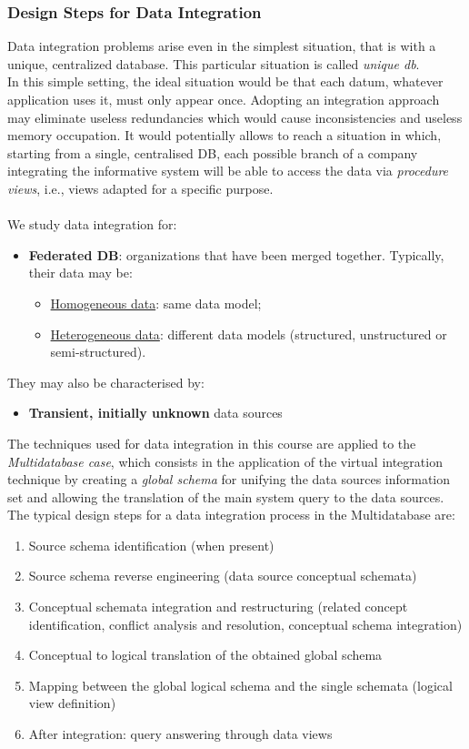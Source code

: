 \documentclass[10pt,a4paper]{article}
\newcommand{\nline}{\\~\\}
\begin{document}
\subsubsection{Design Steps for Data Integration}
\begin{justify}
Data integration problems arise even in the simplest situation, that is with a unique, centralized database. This particular situation is called \textit{unique db}.\\
In this simple setting, the ideal situation would be that each datum, whatever application uses it, must only appear once. Adopting an integration approach may eliminate useless redundancies which would cause inconsistencies and useless memory occupation. It would potentially allows to reach a situation in which, starting from a single, centralised DB, each possible branch of a company integrating the informative system will be able to access the data via \textit{procedure views}, i.e., views adapted for a specific purpose. \nline
We study data integration for:
\begin{itemize}
	\item \textbf{Federated DB}: organizations that have been merged together. Typically, their data may be:
	\begin{itemize}
		\item \uline{Homogeneous data}: same data model;
		\item \uline{Heterogeneous data}: different data models (structured, unstructured or semi-structured).
	\end{itemize}
\end{itemize}
They may also be characterised by:
\begin{itemize}
	\item \textbf{Transient, initially unknown} data sources
\end{itemize}
The techniques used for data integration in this course are applied to the \textit{Multidatabase case}, which consists in the application of the virtual integration technique by creating a \textit{global schema} for unifying the data sources information set and allowing the translation of the main system query to the data sources.
The typical design steps for a data integration process in the Multidatabase are:
\begin{enumerate}
	\item Source schema identification (when present)
	\item Source schema reverse engineering (data source conceptual schemata)
	\item Conceptual schemata integration and restructuring (related concept identification, conflict analysis and resolution, conceptual schema integration)
	\item Conceptual to logical translation of the obtained global schema
	\item Mapping between the global logical schema and the single schemata (logical view definition)
	\item After integration: query answering through data views
\end{enumerate}
\end{justify}
\end{document}
